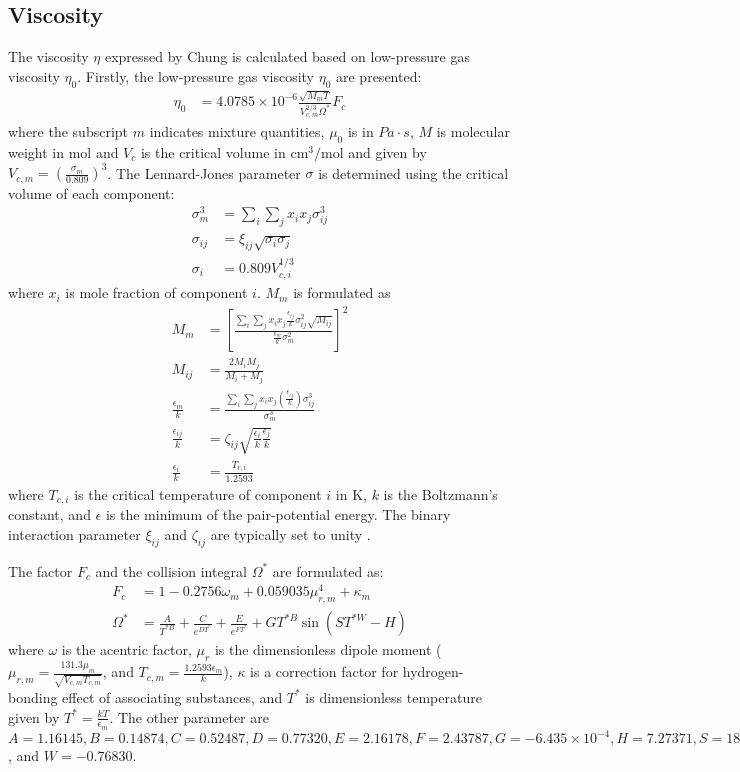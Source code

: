 \subsection{Viscosity}
The viscosity $\eta$ expressed by Chung is calculated based on low-pressure gas viscosity $\eta_0$.
Firstly, the low-pressure gas viscosity $\eta_0$ are presented:
\begin{align}
    \eta_0 &= 4.0785 \times 10^{-6} \frac{\sqrt{M_mT}}{V_{c,m}^{2/3}\Omega^*}F_c
\end{align}
where the subscript $m$ indicates mixture quantities, $\mu_0$ is in $Pa\cdot s$, $M$ is molecular weight in mol and $V_{c}$ is the critical volume in $\text{cm}^3/\text{mol}$ and given by $ V_{c,m} =\left(\frac{\sigma_m}{0.809}\right)^3$. The Lennard-Jones parameter $\sigma$ is determined using the critical volume of each component:
\begin{align}
    \sigma_m^3 &= \sum_i\sum_j x_i x_j \sigma_{ij}^3\\
    \sigma_{ij} &= \xi_{ij} \sqrt{\sigma_i \sigma_j}\\
    \sigma_i &= 0.809 V_{c,i}^{1/3}
\end{align}
where $x_i$ is mole fraction of component $i$.
$M_m$ is formulated as
\begin{align}
    M_m &= \left[\frac{\sum_i\sum_j x_i x_j\frac{\epsilon_{ij}}{k}\sigma_{ij}^2\sqrt{M_{ij}}}{\frac{\epsilon_m}{k}\sigma_m^2}\right]^2 \\
    M_{ij} & = \frac{2M_iM_j}{M_i+M_j}\\
    \frac{\epsilon_m}{k} &= \frac{\sum_i\sum_j x_i x_j\left(\frac{\epsilon_{ij}}{k}\right) \sigma_{ij}^3}{\sigma_m^3 }\\
    \frac{\epsilon_{ij}}{k} &= \zeta_{ij} \sqrt{ \frac{\epsilon_{i}}{k} \frac{\epsilon_{j}}{k}}\\
    \frac{\epsilon_i}{k} &= \frac{T_{c,i}}{1.2593}
\end{align}
where $T_{c,i}$ is the critical temperature of component $i$ in K, $k$ is the Boltzmann's constant, and $\epsilon$ is the minimum of the pair-potential energy. The binary interaction parameter $\xi_{ij}$ and $\zeta_{ij}$ are typically set to unity \cite{chung1988generalized}.

The factor $F_c$ and the collision integral $\Omega^*$ are formulated as:
\begin{align}
F_c &= 1-0.2756\omega_m +0.059035 \mu_{r,m}^4+\kappa_m \\
\Omega^* &=\frac{A}{T^{*B}} +\frac{C}{e^{D T^*}} + \frac{E}{e^{F T^*}} +G T^{*B} \sin(ST^{*W} -H)
\end{align}
where $\omega$ is the acentric factor, $\mu_r$ is the dimensionless dipole moment ($\mu_{r,m} = \frac{131.3 \mu_m}{\sqrt{V_{c,m}T_{c,m}}}$, and $T_{c,m} =\frac{1.2593 \epsilon_m}{k}$), $\kappa$ is a correction factor for hydrogen-bonding effect of associating substances, and $T^*$ is dimensionless temperature given by $T^* = \frac{kT}{\epsilon_m}$. The other parameter are $A = 1.16145, B = 0.14874, C = 0.52487, D = 0.77320, E = 2.16178, F = 2.43787, G = -6.435\times 10^{-4}, H = 7.273 71, S = 18.0323$, and $W = -0.768 30$.

